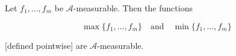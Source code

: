 Let $f_1, \ldots, f_m$ be $\mathcal{A}$-measurable. Then the functions

$$\max\{f_1, \ldots, f_m\} \quad \text{and} \quad \min\{f_1, \ldots, f_m\}$$

[defined pointwise] are $\mathcal{A}$-measurable.